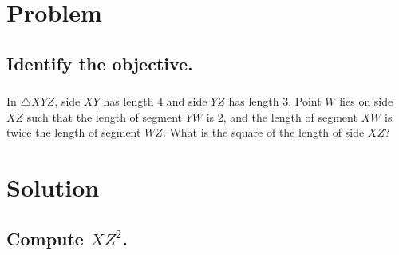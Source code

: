 \documentclass{beamer} %
\begin{document}
\begin{frame} %
  \titlepage
\end{frame}


\section{Problem}

\subsection*{Identify the objective.}

\begin{frame}
  \frametitle{}
  In $\triangle XYZ$, side $XY$ has length $4$ and side $YZ$ has length $3$. Point $W$ lies on side $XZ$ such that the length of segment $YW$ is $2$, and the length of segment $XW$ is twice the length of segment $WZ$. What is the square of the length of side $XZ$?
  \begin{center}
  \end{center}
\end{frame}

\section{Solution}

\subsection*{Compute $XZ^2$.}
\end{document}
